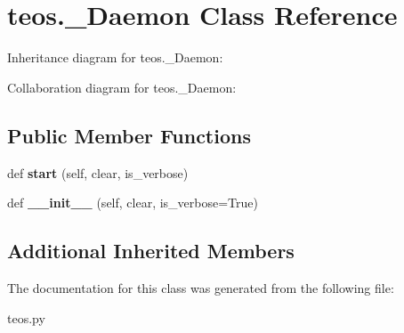 \hypertarget{classteos_1_1__Daemon}{}\section{teos.\+\_\+\+Daemon Class Reference}
\label{classteos_1_1__Daemon}


Inheritance diagram for teos.\+\_\+\+Daemon\+:


Collaboration diagram for teos.\+\_\+\+Daemon\+:
\subsection*{Public Member Functions}
\begin{DoxyCompactItemize}
\item 
\mbox{\label{classteos_1_1__Daemon_addd02c80c80b03010e40781f80750b95}} 
def {\bfseries start} (self, clear, is\+\_\+verbose)
\item 
\mbox{\label{classteos_1_1__Daemon_ab5f27f27672caa925befb063e055c564}} 
def {\bfseries \+\_\+\+\_\+init\+\_\+\+\_\+} (self, clear, is\+\_\+verbose=True)
\end{DoxyCompactItemize}
\subsection*{Additional Inherited Members}


The documentation for this class was generated from the following file\+:\begin{DoxyCompactItemize}
\item 
teos.\+py\end{DoxyCompactItemize}
